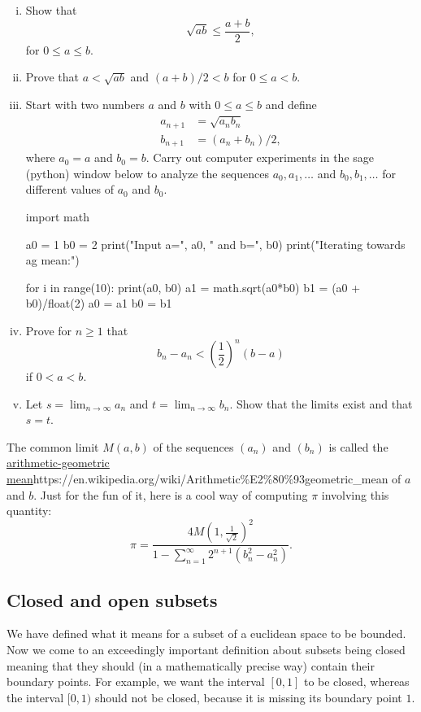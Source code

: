\documentclass{article}
\begin{document}
\beginshex
\begin{enumerate}[(i)]
\item Show that
  $$
  \sqrt{a b} \leq \frac{a+b}{2},
  $$
  for $0 \leq a \leq b$.
\item
  Prove that $a < \sqrt{a b}$ and $(a+b)/2 < b$ for $0\leq a < b$.
\item
  Start with two numbers $a$ and $b$ with $0\leq a\leq b$ and define
  \begin{align*}
    a_{n+1} &= \sqrt{a_n b_n}\\
    b_ {n+1} &= (a_n + b_n)/2,
  \end{align*}
  where $a_0 = a$ and $b_0 = b$. Carry out computer experiments in the sage (python) window below
  to analyze the sequences $a_0, a_1, \dots$ and $b_0, b_1, \dots$
  for different values of $a_0$ and $b_0$.


\begin{sage}
import math

a0 = 1
b0 = 2
print("Input a=", a0, " and b=", b0)
print("Iterating towards ag mean:")
  
for i in range(10):
  print(a0, b0)
  a1 = math.sqrt(a0*b0)
  b1 = (a0 + b0)/float(2)
  a0 = a1
  b0 = b1
\end{sage}
\item
  Prove for $n\geq 1$ that
  $$
  b_n - a_n < \left(\frac{1}{2}\right)^n (b-a)
  $$
  if $0< a < b$.
\item
  Let $s = \lim_{n\to \infty} a_n$ and $t=\lim_{n\to \infty} b_n$.
  Show that the limits exist and that $s = t$.
\end{enumerate}
The common limit $M(a, b)$ of the sequences $(a_n)$ and
$(b_n)$ is called the \url{arithmetic-geometric mean}{https://en.wikipedia.org/wiki/Arithmetic\%E2\%80\%93geometric_mean} of $a$ and $b$.
Just for the fun of it, here is a cool way of computing $\pi$
involving this quantity:
$$
\pi = \frac{4 M(1, \frac{1}{\sqrt{2}})^2}{1 - \sum_{n=1}^\infty 2^ {n+1}(b_n^2 - a_n^2)}.
$$
\endshex

\subsection{Closed and open subsets}

We have defined what it means for a subset of a euclidean space to be bounded. Now
we come to an exceedingly important definition about subsets being closed meaning
that they should (in a mathematically precise way) contain their boundary points. For example, we want the interval $[0, 1]$ to be closed, whereas the
interval $[0, 1)$ should not be closed, because it is missing its
boundary point $1$.
\end{document}
